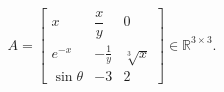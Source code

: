 \documentclass{article}
\begin{document}
	\[
	A=\begin{bmatrix}
		x & \dfrac{x}{y} & 0\\[3mm]
		e^{-x} & -\tfrac{1}{y} & \sqrt[3]{x}\\
		\sin\theta & -3 & 2
	\end{bmatrix}\in\mathbb{R}^{3\times 3}.
	\]
\end{document}
